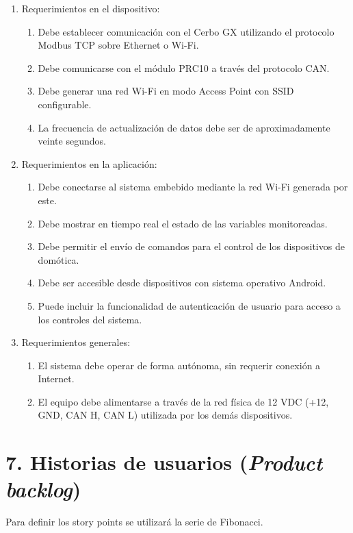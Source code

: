 \documentclass[
11pt, %
]{charter}
\begin{document}
\begin{enumerate}
	\item Requerimientos en el dispositivo:
		\begin{enumerate}
			\item Debe establecer comunicación con el Cerbo GX utilizando el protocolo Modbus TCP sobre Ethernet o Wi-Fi.
			\item Debe comunicarse con el módulo PRC10 a través del protocolo CAN.
			\item Debe generar una red Wi-Fi en modo Access Point con SSID configurable.
			\item La frecuencia de actualización de datos debe ser de aproximadamente veinte segundos.			
		\end{enumerate}
	\item Requerimientos en la aplicación:
		\begin{enumerate}
			\item Debe conectarse al sistema embebido mediante la red Wi-Fi generada por este.
			\item Debe mostrar en tiempo real el estado de las variables monitoreadas.
			\item Debe permitir el envío de comandos para el control de los dispositivos de domótica.
			\item Debe ser accesible desde dispositivos con sistema operativo Android.
			\item Puede incluir la funcionalidad de autenticación de usuario para acceso a los controles del sistema.
		\end{enumerate}
	\item Requerimientos generales:
		\begin{enumerate}
			\item El sistema debe operar de forma autónoma, sin requerir conexión a Internet.
			\item El equipo debe alimentarse a través de la red física de 12 VDC (+12, GND, CAN H, CAN L) utilizada por los demás dispositivos.
		\end{enumerate}
\end{enumerate}

\section{7. Historias de usuarios (\textit{Product backlog})}
\label{sec:backlog}

Para definir los story points se utilizará la serie de Fibonacci.
\end{document}
